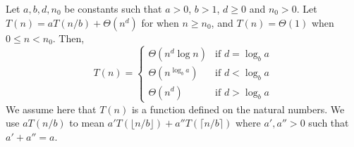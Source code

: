 \documentclass{article}
\begin{document}
\begin{enumerate}
\begin{theorem}
Let $a, b, d, n_0$ be constants such that $a > 0$, $b > 1$, $d \ge 0$ and $n_0 > 0$. Let $T(n) = aT(n/b) + \Theta(n^d)$ for when $n \ge n_0$, and $T(n) = \Theta(1)$ when $0 \le n < n_0$. Then,
\[
T(n) = \begin{cases}
\Theta(n^d \log n) & \text{if } d = \log_b a \\
\Theta(n^{\log_b a}) & \text{if } d < \log_b a \\
\Theta(n^d) & \text{if } d > \log_b a
\end{cases}
\]
We assume here that $T(n)$ is a function defined on the natural numbers. We use $aT(n/b)$ to mean $a'T(\lfloor n/b \rfloor) + a''T(\lceil n/b \rceil)$ where $a', a'' > 0$ such that $a' + a'' = a$.
\end{theorem}

\end{enumerate}
\end{document}
